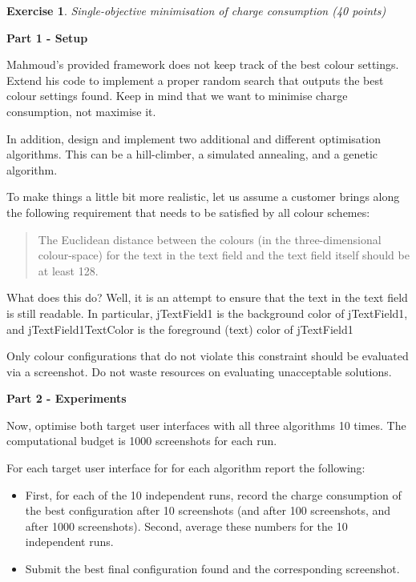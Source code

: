 \documentclass{pracs}
\newtheorem{exercise}{Exercise}
\begin{document}
\begin{exercise}
Single-objective minimisation of charge consumption (40 points)
\end{exercise}

\noindent\textbf{Part 1 - Setup}

Mahmoud's provided framework does not keep track of the best colour settings. Extend his code to implement a proper random search that outputs the best colour settings found. Keep in mind that we want to minimise charge consumption, not maximise it. 

In addition, design and implement two additional and different optimisation algorithms. This can be a hill-climber, a simulated annealing, and a genetic algorithm.

To make things a little bit more realistic, let us assume a customer brings along the following requirement that needs to be satisfied by all colour schemes:

\begin{quote}
The Euclidean distance between the colours (in the three-dimensional colour-space) for the text in the text field and the text field itself should be at least 128.
\end{quote}

What does this do? Well, it is an attempt to ensure that the text in the text field is still readable. In particular, jTextField1 is the background color of jTextField1, and jTextField1TextColor is the foreground (text) color of jTextField1

Only colour configurations that do not violate this constraint should be evaluated via a screenshot. Do not waste resources on evaluating unacceptable solutions.

\noindent\textbf{Part 2 - Experiments}

Now, optimise both target user interfaces with all three algorithms 10 times. The computational budget is 1000 screenshots for each run. 

For each target user interface for for each algorithm report the following:
\begin{itemize}
\item First, for each of the 10 independent runs, record the charge consumption of the best configuration after 10 screenshots (and after 100 screenshots, and after 1000 screenshots). Second, average these numbers for the 10 independent runs.
\item Submit the best final configuration found and the corresponding screenshot.
\end{itemize}
\end{document}
